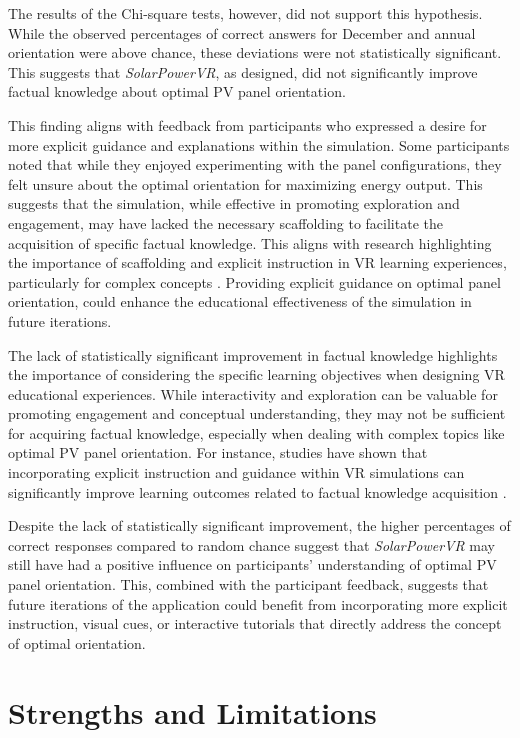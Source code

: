 \documentclass[draft, final]{vutinfth} %
\begin{document}
The results of the Chi-square tests, however, did not support this hypothesis. While the observed percentages of correct answers for December and annual orientation were above chance, these deviations were not statistically significant. This suggests that \textit{SolarPowerVR}, as designed, did not significantly improve factual knowledge about optimal PV panel orientation.

This finding aligns with feedback from participants who expressed a desire for more explicit guidance and explanations within the simulation. Some participants noted that while they enjoyed experimenting with the panel configurations, they felt unsure about the optimal orientation for maximizing energy output. This suggests that the simulation, while effective in promoting exploration and engagement, may have lacked the necessary scaffolding to facilitate the acquisition of specific factual knowledge. This aligns with research highlighting the importance of scaffolding and explicit instruction in VR learning experiences, particularly for complex concepts \cite{Dalgarno2010Learning, Mikropoulos2011VrEducational}. Providing explicit guidance on optimal panel orientation, could enhance the educational effectiveness of the simulation in future iterations.

The lack of statistically significant improvement in factual knowledge highlights the importance of considering the specific learning objectives when designing VR educational experiences. While interactivity and exploration can be valuable for promoting engagement and conceptual understanding, they may not be sufficient for acquiring factual knowledge, especially when dealing with complex topics like optimal PV panel orientation. For instance, studies have shown that incorporating explicit instruction and guidance within VR simulations can significantly improve learning outcomes related to factual knowledge acquisition \cite{Merchant2014VrEffectiveness}.

Despite the lack of statistically significant improvement, the higher percentages of correct responses compared to random chance suggest that \textit{SolarPowerVR} may still have had a positive influence on participants' understanding of optimal PV panel orientation. This, combined with the participant feedback, suggests that future iterations of the application could benefit from incorporating more explicit instruction, visual cues, or interactive tutorials that directly address the concept of optimal orientation.

\section{Strengths and Limitations}
\end{document}
